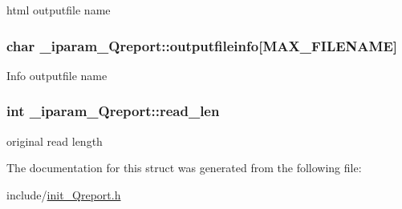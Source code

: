 html outputfile name \hypertarget{struct__iparam__Qreport_a75f5c38f9365c0c1370040928f43d316}{
\subsubsection[{outputfileinfo}]{\setlength{\rightskip}{0pt plus 5cm}char \+\_\+iparam\+\_\+\+Qreport\+::outputfileinfo\mbox{[}{\bf M\+A\+X\+\_\+\+F\+I\+L\+E\+N\+A\+M\+E}\mbox{]}}}\label{struct__iparam__Qreport_a75f5c38f9365c0c1370040928f43d316}
Info outputfile name \hypertarget{struct__iparam__Qreport_a1004bab2a5776669710b74925ba4d338}{
\subsubsection[{read\+\_\+len}]{\setlength{\rightskip}{0pt plus 5cm}int \+\_\+iparam\+\_\+\+Qreport\+::read\+\_\+len}}\label{struct__iparam__Qreport_a1004bab2a5776669710b74925ba4d338}
original read length 

The documentation for this struct was generated from the following file\+:\begin{DoxyCompactItemize}
\item 
include/\hyperlink{init__Qreport_8h}{init\+\_\+\+Qreport.\+h}\end{DoxyCompactItemize}
